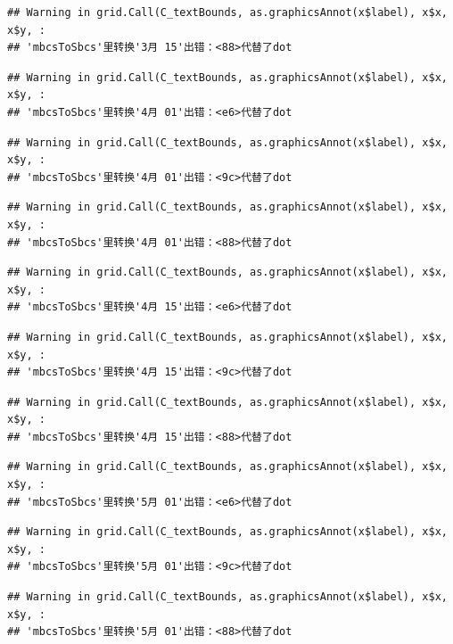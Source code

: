 \documentclass[
]{article}
\begin{document}
\begin{verbatim}
## Warning in grid.Call(C_textBounds, as.graphicsAnnot(x$label), x$x, x$y, :
## 'mbcsToSbcs'里转换'3月 15'出错：<88>代替了dot
\end{verbatim}

\begin{verbatim}
## Warning in grid.Call(C_textBounds, as.graphicsAnnot(x$label), x$x, x$y, :
## 'mbcsToSbcs'里转换'4月 01'出错：<e6>代替了dot
\end{verbatim}

\begin{verbatim}
## Warning in grid.Call(C_textBounds, as.graphicsAnnot(x$label), x$x, x$y, :
## 'mbcsToSbcs'里转换'4月 01'出错：<9c>代替了dot
\end{verbatim}

\begin{verbatim}
## Warning in grid.Call(C_textBounds, as.graphicsAnnot(x$label), x$x, x$y, :
## 'mbcsToSbcs'里转换'4月 01'出错：<88>代替了dot
\end{verbatim}

\begin{verbatim}
## Warning in grid.Call(C_textBounds, as.graphicsAnnot(x$label), x$x, x$y, :
## 'mbcsToSbcs'里转换'4月 15'出错：<e6>代替了dot
\end{verbatim}

\begin{verbatim}
## Warning in grid.Call(C_textBounds, as.graphicsAnnot(x$label), x$x, x$y, :
## 'mbcsToSbcs'里转换'4月 15'出错：<9c>代替了dot
\end{verbatim}

\begin{verbatim}
## Warning in grid.Call(C_textBounds, as.graphicsAnnot(x$label), x$x, x$y, :
## 'mbcsToSbcs'里转换'4月 15'出错：<88>代替了dot
\end{verbatim}

\begin{verbatim}
## Warning in grid.Call(C_textBounds, as.graphicsAnnot(x$label), x$x, x$y, :
## 'mbcsToSbcs'里转换'5月 01'出错：<e6>代替了dot
\end{verbatim}

\begin{verbatim}
## Warning in grid.Call(C_textBounds, as.graphicsAnnot(x$label), x$x, x$y, :
## 'mbcsToSbcs'里转换'5月 01'出错：<9c>代替了dot
\end{verbatim}

\begin{verbatim}
## Warning in grid.Call(C_textBounds, as.graphicsAnnot(x$label), x$x, x$y, :
## 'mbcsToSbcs'里转换'5月 01'出错：<88>代替了dot
\end{verbatim}
\end{document}
